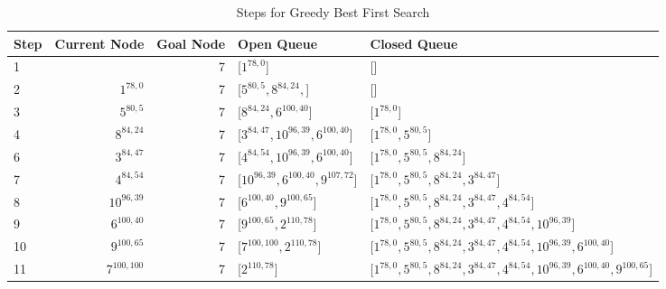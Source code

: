 \documentclass{article}
\begin{document}
    \begin{table}[!htp]\centering
        \caption{Steps for Greedy Best First Search}\label{tab:a*5}
        \scriptsize
        \begin{tabular}{lrrll}\toprule
        Step &Current Node &Goal Node & Open Queue &Closed Queue  \\\midrule
        1&  &7 &[$1^{78,0}$] &[] \\
        2& $1^{78,0}$ &7 &[$5^{80,5}, 8^{84,24}, $] &[] \\
        3& $5^{80,5}$ &7 &[$8^{84,24}, 6^{100, 40}$] &[$1^{78,0}$] \\
        4& $8^{84,24}$ &7 &[$3^{84,47}, 10^{96,39}, 6^{100, 40}$] &[$1^{78,0}, 5^{80,5}$] \\
        6& $3^{84,47}$ &7 &[$4^{84,54}, 10^{96,39}, 6^{100, 40}$] &[$1^{78,0}, 5^{80,5}, 8^{84,24}$] \\
        7& $4^{84,54}$ &7 &[$10^{96,39}, 6^{100, 40}, 9^{107,72}$] &[$1^{78,0}, 5^{80,5}, 8^{84,24}, 3^{84,47}$] \\
        8& $10^{96,39}$ &7 &[$6^{100, 40}, 9^{100,65}$] &[$1^{78,0}, 5^{80,5}, 8^{84,24}, 3^{84,47}, 4^{84,54}$] \\
        9& $6^{100, 40}$ &7 &[$9^{100,65}, 2^{110,78}$] &[$1^{78,0}, 5^{80,5}, 8^{84,24}, 3^{84,47}, 4^{84,54}, 10^{96,39}$] \\
        10& $9^{100,65}$ &7 &[$7^{100,100}, 2^{110,78}$] &[$1^{78,0}, 5^{80,5}, 8^{84,24}, 3^{84,47}, 4^{84,54}, 10^{96,39}, 6^{100, 40}$] \\
        11& $7^{100,100}$ &7 &[$2^{110,78}$] &[$1^{78,0}, 5^{80,5}, 8^{84,24}, 3^{84,47}, 4^{84,54}, 10^{96,39}, 6^{100, 40}, 9^{100,65}$] \\
        \end{tabular}
    \end{table}
\end{document}
